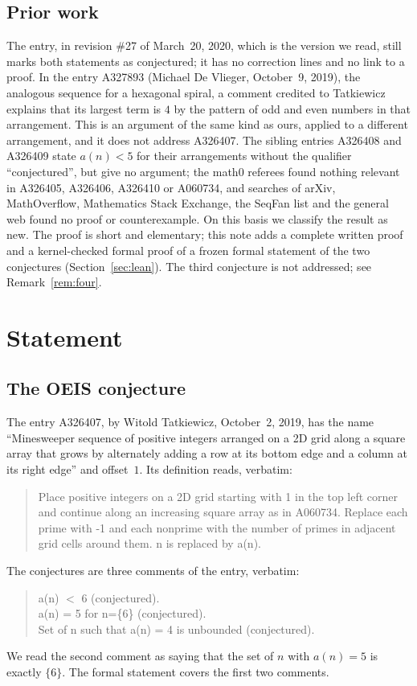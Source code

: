 \documentclass[11pt]{amsart}
\theoremstyle{plain}
\theoremstyle{definition}
\begin{document}
\subsection*{Prior work}
The entry, in revision \#27 of March~20, 2020, which is the version we read, still marks both statements as conjectured; it has no correction lines and no link to a proof.
In the entry A327893 \cite{A327893} (Michael De Vlieger, October~9, 2019), the analogous sequence for a hexagonal spiral, a comment credited to Tatkiewicz explains that its largest term is $4$ by the pattern of odd and even numbers in that arrangement.
This is an argument of the same kind as ours, applied to a different arrangement, and it does not address A326407.
The sibling entries A326408 \cite{A326408} and A326409 \cite{A326409} state $a(n)<5$ for their arrangements without the qualifier ``conjectured'', but give no argument; the math0 referees found nothing relevant in A326405, A326406, A326410 or A060734, and searches of arXiv, MathOverflow, Mathematics Stack Exchange, the SeqFan list and the general web found no proof or counterexample.
On this basis we classify the result as new.
The proof is short and elementary; this note adds a complete written proof and a kernel-checked formal proof of a frozen formal statement of the two conjectures (Section~\ref{sec:lean}).
The third conjecture is not addressed; see Remark~\ref{rem:four}.

\section{Statement}\label{sec:statement}

\subsection*{The OEIS conjecture}
The entry A326407, by Witold Tatkiewicz, October~2, 2019, has the name ``Minesweeper sequence of positive integers arranged on a 2D grid along a square array that grows by alternately adding a row at its bottom edge and a column at its right edge'' and offset~$1$.
Its definition reads, verbatim:
\begin{quote}
Place positive integers on a 2D grid starting with 1 in the top left corner and continue along an increasing square array as in A060734.
Replace each prime with -1 and each nonprime with the number of primes in adjacent grid cells around them.
n is replaced by a(n).
\end{quote}
The conjectures are three comments of the entry, verbatim:
\begin{quote}
a(n) $<$ 6 (conjectured).\\
a(n) = 5 for n=\{6\} (conjectured).\\
Set of n such that a(n) = 4 is unbounded (conjectured).
\end{quote}
We read the second comment as saying that the set of $n$ with $a(n)=5$ is exactly $\{6\}$.
The formal statement covers the first two comments.
\end{document}
